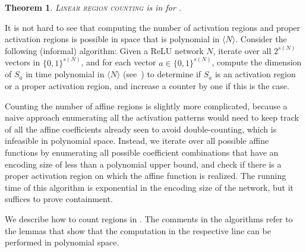 \documentclass{article}
\newtheorem{theorem}{Theorem}[section]
\begin{document}
\begin{theorem}
\label{thm:poly_space_algorithms}
    \textsc{Linear region counting} is in \FP\SPACE{} for .
\end{theorem}
It is not hard to see that computing the number of activation regions and proper activation regions is possible in space that is polynomial in $\langle N\rangle$. Consider the following (informal) algorithm:
Given a ReLU network $N$, iterate over all $2^{s(N)}$ vectors in $\{0,1\}^{s(N)}$, and for each vector $a\in \{0,1\}^{s(N)}$, compute the dimension of $S_a$ in time polynomial in $\langle N\rangle$ (see~) to determine if $S_a$ is an activation region or a proper activation region, and increase a counter by one if this is the case.

Counting the number of affine regions is slightly more complicated, because a naive approach enumerating all the activation patterns would need to keep track of all the affine coefficients already seen to avoid double-counting, which is infeasible in polynomial space. Instead, we iterate over all possible affine functions by enumerating all possible coefficient combinations that have an encoding size of less than a polynomial upper bound, and check if there is a proper activation region on which the affine function is realized. The running time of this algorithm is exponential in the encoding size of the network, but it suffices to prove \FP\SPACE{} containment.

We describe how to count regions in .
The comments in the algorithms refer to the lemmas that show that the computation in the respective line can be performed in polynomial space.
\end{document}
